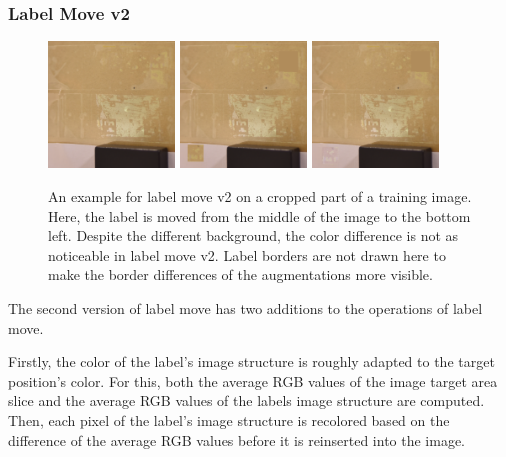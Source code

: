 \documentclass[10pt]{book}
\begin{document}
\subsubsection{Label Move v2}

\begin{figure}
  \centering
     {\includegraphics[width=0.3\textwidth]{image/aug_lm2_before}}
     {\includegraphics[width=0.3\textwidth]{image/aug_lm2_after_old}}
     {\includegraphics[width=0.3\textwidth]{image/aug_lm2_after}}
  \caption{An example for label move v2 on a cropped part of a training image. Here, the label is moved from the middle of the image to the bottom left. Despite the different background, the color difference is not as noticeable in label move v2. Label borders are not drawn here to make the border differences of the augmentations more visible.}
  \label{fig:aug_lm2_example}
\end{figure}

The second version of label move has two additions to the operations of label move. 

Firstly, the color of the label's image structure is roughly adapted to the target position's color. For this, both the average RGB values of the image target area slice and the average RGB values of the labels image structure are computed. Then, each pixel of the label's image structure is recolored based on the difference of the average RGB values before it is reinserted into the image.
\end{document}
